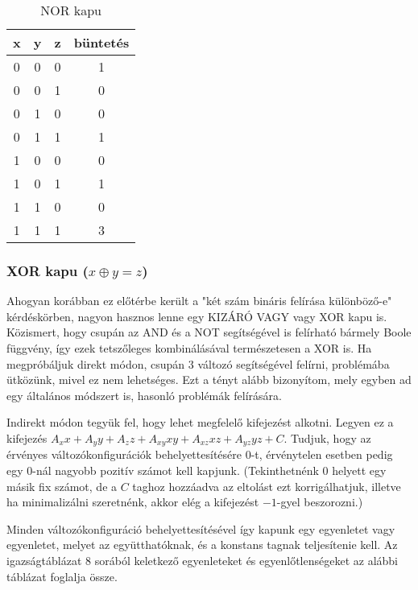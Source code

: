 \begin{table}[ht]
	\footnotesize
	\centering
	\begin{tabular}{ c c c c }
		\toprule
		x & y & z & büntetés \\
		\midrule
		0 & 0 & 0 & 1 \\
		0 & 0 & 1 & 0 \\
		0 & 1 & 0 & 0 \\
		0 & 1 & 1 & 1 \\
		1 & 0 & 0 & 0 \\
		1 & 0 & 1 & 1 \\
		1 & 1 & 0 & 0 \\
		1 & 1 & 1 & 3 \\		
		\bottomrule
	\end{tabular}
	\caption{NOR kapu}
	\label{tab:NORgate}
\end{table}

\subsubsection{XOR kapu ($x \oplus y = z$)}

Ahogyan korábban ez előtérbe került a "két szám bináris felírása különböző-e" kérdéskörben, nagyon hasznos lenne egy KIZÁRÓ VAGY vagy XOR kapu is. Közismert, hogy csupán az AND és a NOT segítségével is felírható bármely Boole függvény, így ezek tetszőleges kombinálásával természetesen a XOR is.
Ha megpróbáljuk direkt módon, csupán 3 változó segítségével felírni, problémába ütközünk, mivel ez nem lehetséges. Ezt a tényt alább bizonyítom, mely egyben ad egy általános módszert is, hasonló problémák felírására.

Indirekt módon tegyük fel, hogy lehet megfelelő kifejezést alkotni. Legyen ez a kifejezés $A_xx+A_yy+A_zz+A_{xy}xy+A_{xz}xz+A_{yz}yz+C$. Tudjuk, hogy az érvényes változókonfigurációk behelyettesítésére $0$-t, érvénytelen esetben pedig egy $0$-nál nagyobb pozitív számot kell kapjunk. 
(Tekinthetnénk $0$ helyett egy másik fix számot, de a $C$ taghoz hozzáadva az eltolást ezt korrigálhatjuk, illetve ha minimalizálni szeretnénk, akkor elég a kifejezést $-1$-gyel beszorozni.)

Minden változókonfiguráció behelyettesítésével így kapunk egy egyenletet vagy egyenletet, melyet az együtthatóknak, és a konstans tagnak teljesítenie kell. Az igazságtáblázat 8 sorából keletkező egyenleteket és egyenlőtlenségeket az alábbi táblázat foglalja össze.

